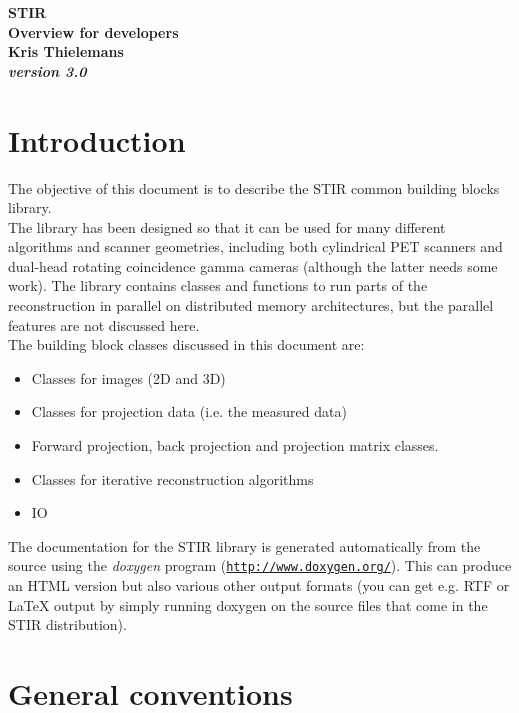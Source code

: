 \documentclass{article}
\def\R2Lurl#1#2{\mbox{\href{#1}{\tt #2}}}
\begin{document}
\begin{center}
\textbf{{\huge STIR \\
Overview for developers}}\\
\textbf{Kris Thielemans}\\
\textbf{\textit{version 3.0}}


\end{center}

\tableofcontents


\section{
Introduction}

The objective of this document is to describe the STIR common 
building blocks library.\\
The library has been designed so that it can be used for many 
different algorithms and scanner geometries, including both cylindrical 
PET scanners and dual-head rotating coincidence gamma cameras 
(although the latter needs some work). The library contains classes 
and functions to run parts of the reconstruction in parallel 
on distributed memory architectures, but the parallel features 
are not discussed here.\\
The building block classes discussed in this document are:
\begin{itemize}
\item
Classes for images (2D and 3D)
\item 
Classes for projection data (i.e. the measured data)
\item 
Forward projection, back projection and projection matrix classes.
\item 
Classes for iterative reconstruction algorithms
\item IO
\end{itemize}

The documentation
for the STIR library is generated automatically from the source 
using the \textit{doxygen} program (\R2Lurl{http://www.doxygen.org/ }{http://www.doxygen.org/}). 
This can produce an HTML version but also various other output 
formats (you can get e.g. RTF or LaTeX output by simply running 
doxygen on the source files that come in the STIR distribution). 


\section{
General conventions}
\end{document}
